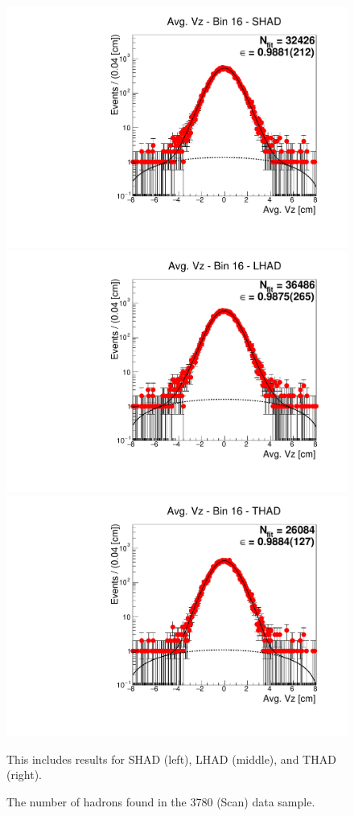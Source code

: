\begin{figure}[H]
\centering
\includegraphics[scale=0.25]{figures/plots/nonDDbar_fit_results/scan/fit_scan_16_data_SHAD.pdf}
\hspace{-0.5cm}
\includegraphics[scale=0.25]{figures/plots/nonDDbar_fit_results/scan/fit_scan_16_data_LHAD.pdf}
\hspace{-0.5cm}
\includegraphics[scale=0.25]{figures/plots/nonDDbar_fit_results/scan/fit_scan_16_data_THAD.pdf}
\caption{The number of hadrons found in the 3780 (Scan) data sample.}
{This includes results for SHAD (left), LHAD (middle), and THAD (right).}
\label{fig:hadron_fits_scan_16}
\end{figure}

